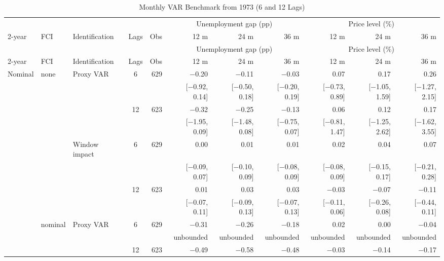 \begingroup\scriptsize\setlength{\tabcolsep}{0.9pt}
\begin{longtable}{lllcrrrrrrr}
\caption{Monthly VAR Benchmark from 1973 (6 and 12 Lags)}\label{tab:appmonthly73}\\
\toprule
 & & & & & \multicolumn{3}{c}{Unemployment gap (pp)} & \multicolumn{3}{c}{Price level (\%)}\\ \cmidrule(lr){6-8}\cmidrule(lr){9-11}
2-year & FCI & Identification & Lags & Obs & 12 m & 24 m & 36 m & 12 m & 24 m & 36 m\\
\midrule\endfirsthead
\toprule
 & & & & & \multicolumn{3}{c}{Unemployment gap (pp)} & \multicolumn{3}{c}{Price level (\%)}\\ \cmidrule(lr){6-8}\cmidrule(lr){9-11}
2-year & FCI & Identification & Lags & Obs & 12 m & 24 m & 36 m & 12 m & 24 m & 36 m\\
\midrule\endhead
\bottomrule\endfoot
Nominal & none & Proxy VAR & 6 & 629 & $-$0.20 & $-$0.11 & $-$0.03 & 0.07 & 0.17 & 0.26\\
 & & & & & {\tiny [$-$0.92, 0.14]} & {\tiny [$-$0.50, 0.18]} & {\tiny [$-$0.20, 0.19]} & {\tiny [$-$0.73, 0.89]} & {\tiny [$-$1.05, 1.59]} & {\tiny [$-$1.27, 2.15]}\\
 &  &  & 12 & 623 & $-$0.32 & $-$0.25 & $-$0.13 & 0.06 & 0.12 & 0.17\\
 & & & & & {\tiny [$-$1.95, 0.09]} & {\tiny [$-$1.48, 0.08]} & {\tiny [$-$0.75, 0.07]} & {\tiny [$-$0.81, 1.47]} & {\tiny [$-$1.25, 2.62]} & {\tiny [$-$1.62, 3.55]}\\
 &  & Window impact & 6 & 629 & 0.00 & 0.01 & 0.01 & 0.02 & 0.04 & 0.07\\
 & & & & & {\tiny [$-$0.09, 0.07]} & {\tiny [$-$0.10, 0.09]} & {\tiny [$-$0.08, 0.09]} & {\tiny [$-$0.08, 0.09]} & {\tiny [$-$0.15, 0.17]} & {\tiny [$-$0.21, 0.28]}\\
 &  &  & 12 & 623 & 0.01 & 0.03 & 0.03 & $-$0.03 & $-$0.07 & $-$0.11\\
 & & & & & {\tiny [$-$0.07, 0.11]} & {\tiny [$-$0.09, 0.13]} & {\tiny [$-$0.07, 0.13]} & {\tiny [$-$0.11, 0.06]} & {\tiny [$-$0.26, 0.08]} & {\tiny [$-$0.44, 0.11]}\\
 & nominal & Proxy VAR & 6 & 629 & $-$0.31 & $-$0.26 & $-$0.18 & 0.02 & 0.00 & $-$0.04\\
 & & & & & {\tiny unbounded} & {\tiny unbounded} & {\tiny unbounded} & {\tiny unbounded} & {\tiny unbounded} & {\tiny unbounded}\\
 &  &  & 12 & 623 & $-$0.49 & $-$0.58 & $-$0.48 & $-$0.03 & $-$0.14 & $-$0.17\\

\end{longtable}
